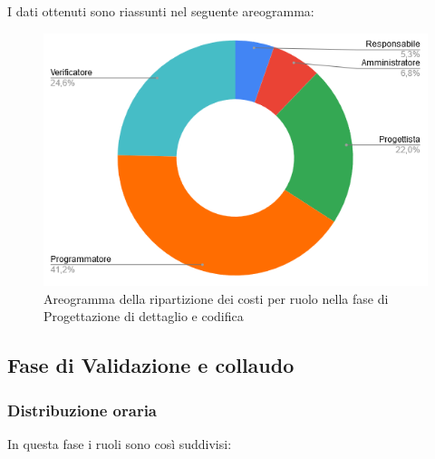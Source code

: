 I dati ottenuti sono riassunti nel seguente areogramma:
\begin{figure}[H]
\centering
\includegraphics[scale=0.60]{img/grafici/torta_fase_prog_cod.png}
\caption{Areogramma della ripartizione dei costi per ruolo nella fase di Progettazione di dettaglio e codifica}
\end{figure}


\subsection{Fase di Validazione e collaudo}
\subsubsection{Distribuzione oraria}
In questa fase i ruoli sono così suddivisi:

